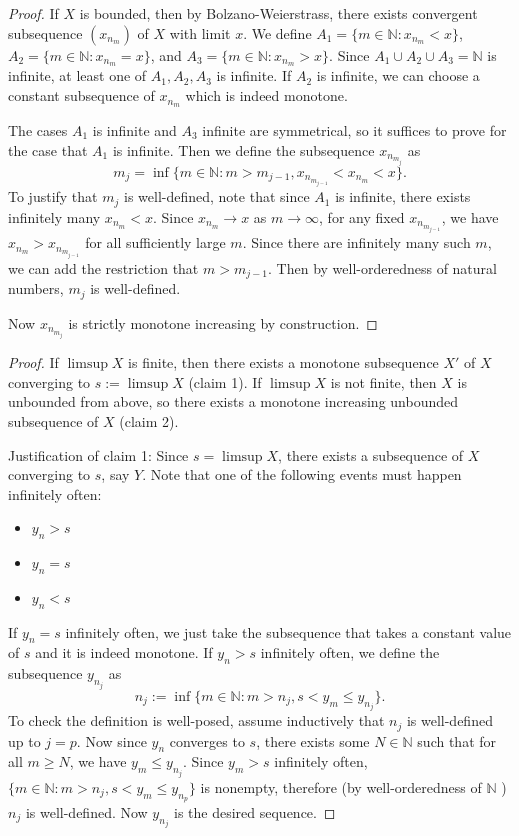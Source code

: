 \begin{enumerate}
\begin{proof}
	If $X$ is bounded, then by Bolzano-Weierstrass, there exists convergent subsequence $(x_{n_m})$ of $X$ with limit $x$. We define $A_1 = \{m \in \mathbb{N}: x_{n_m} < x\} $, $A_2 = \{m \in \mathbb{N}: x_{n_m} = x\} $, and $A_3 = \{m \in \mathbb{N}: x_{n_m} > x\} $. Since $A_1 \cup A_2 \cup A_3 = \mathbb{N} $ is infinite, at least one of $A_1, A_2, A_3$ is infinite. If $A_2$ is infinite, we can choose a constant subsequence of $x_{n_m}$ which is indeed monotone.

	The cases $A_1$ is infinite and $A_3$ infinite are symmetrical, so it suffices to prove for the case that $A_1$ is infinite. Then we define the subsequence $x_{n_{m_j}}$ as
	\[
		m_j = \operatorname{inf} 
		\{m \in \mathbb{N}: m > m_{j-1}, x_{n_{m_{j-1}}}< x_{n_m} < x\} 
	.\] 
	To justify that $m_j$ is well-defined, note that since  $A_1$ is infinite, there exists infinitely many $x_{n_m} < x$. Since  $x_{n_m} \to x$ as $m \to \infty $, for any fixed $x_{n_{m_{j-1}}}$, we have $x_{n_m}>x_{n_{m_{j-1}}}$ for all sufficiently large $m$. Since there are infinitely many such $m$, we can add the restriction that $m > m_{j-1}$. Then by well-orderedness of natural numbers, $m_j$ is well-defined.

	Now $x_{n_{m_j}}$ is strictly monotone increasing by construction.
\end{proof}

\begin{proof}
	If $\limsup X$ is finite, then there exists a monotone subsequence $X'$ of $X$ converging to $s :=\limsup X$ (claim 1). If $\limsup X$ is not finite, then $X$ is unbounded from above, so there exists a monotone increasing unbounded subsequence of $X$ (claim 2).

	Justification of claim 1:
	Since $s = \limsup X$, there exists a subsequence of $X$ converging to $s$, say $Y$. Note that one of the following events must happen infinitely often: 
	\begin{itemize}
		\item  $y_n > s$
		\item $y_n = s$ 
		\item $y_n < s$
	\end{itemize}
	If $y_n = s$ infinitely often, we just take the subsequence that takes a constant value of $s$ and it is indeed monotone. If $y_n > s$ infinitely often, we define the subsequence $y_{n_j} $ as \[
		n_j := \operatorname{inf} \{m \in \mathbb{N}: m > n_j, s < y_m \le  y_{n_j}\} 
	.\] 
	To check the definition is well-posed, assume inductively that $n_j$ is well-defined up to $j = p$. Now since $y_n$ converges to $s$, there exists some $N \in \mathbb{N}$ such that for all  $m \ge  N$, we have $y_m \le y_{n_j} $. Since $y_m > s$ infinitely often, $\{m \in \mathbb{N}: m > n_j, s < y_m \le  y_{n_p}\}$ is nonempty, therefore (by well-orderedness of $\mathbb{N}$ ) $n_j$ is well-defined. Now $y_{n_j} $ is the desired sequence.


\end{proof}
\end{enumerate}
